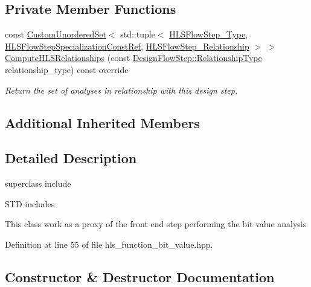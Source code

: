 \subsection*{Private Member Functions}
\begin{DoxyCompactItemize}
\item 
const \hyperlink{classCustomUnorderedSet}{Custom\+Unordered\+Set}$<$ std\+::tuple$<$ \hyperlink{hls__step_8hpp_ada16bc22905016180e26fc7e39537f8d}{H\+L\+S\+Flow\+Step\+\_\+\+Type}, \hyperlink{hls__step_8hpp_a5fdd2edf290c196531d21d68e13f0e74}{H\+L\+S\+Flow\+Step\+Specialization\+Const\+Ref}, \hyperlink{hls__step_8hpp_a3ad360b9b11e6bf0683d5562a0ceb169}{H\+L\+S\+Flow\+Step\+\_\+\+Relationship} $>$ $>$ \hyperlink{classHLSFunctionBitValue_acf7f54956118f90a2d2e76f619656af4}{Compute\+H\+L\+S\+Relationships} (const \hyperlink{classDesignFlowStep_a723a3baf19ff2ceb77bc13e099d0b1b7}{Design\+Flow\+Step\+::\+Relationship\+Type} relationship\+\_\+type) const override
\begin{DoxyCompactList}\small\item\em Return the set of analyses in relationship with this design step. \end{DoxyCompactList}\end{DoxyCompactItemize}
\subsection*{Additional Inherited Members}


\subsection{Detailed Description}
superclass include 

S\+TD includes

This class work as a proxy of the front end step performing the bit value analysis 

Definition at line 55 of file hls\+\_\+function\+\_\+bit\+\_\+value.\+hpp.



\subsection{Constructor \& Destructor Documentation}
\mbox{\label{classHLSFunctionBitValue_a26534e8d7235d679fc527d3085722541}} 
